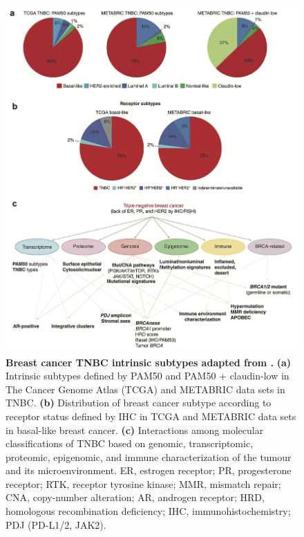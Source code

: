 \begin{figure}
\centering
\includegraphics[width=\textwidth]{Figures/chap1/Breastcancersubtypes.png}
	\caption[Breast cancer subtypes]
	{\small
	    \textbf{Breast cancer TNBC intrinsic subtypes adapted from \cite{garrido2019insights}.}
	    \textbf{(a)} Intrinsic subtypes defined by PAM50 and PAM50 + claudin-low in The Cancer Genome Atlas (TCGA) and METABRIC data sets in \ac{TNBC}.
	    \textbf{(b)} Distribution of breast cancer subtype according to receptor status defined by IHC in TCGA and METABRIC data sets in basal-like breast cancer.
	    \textbf{(c)} Interactions among molecular classifications of TNBC based on genomic, transcriptomic, proteomic, epigenomic, and immune characterization of the tumour and its microenvironment. ER, estrogen receptor; PR, progesterone receptor; RTK, receptor tyrosine kinase; MMR, mismatch repair; CNA, copy-number alteration; AR, androgen receptor; HRD, homologous recombination deficiency; IHC, immunohistochemistry; PDJ (PD-L1/2, JAK2).
	}
	\label{fig:Breastcancersubtypes}
\end{figure}



